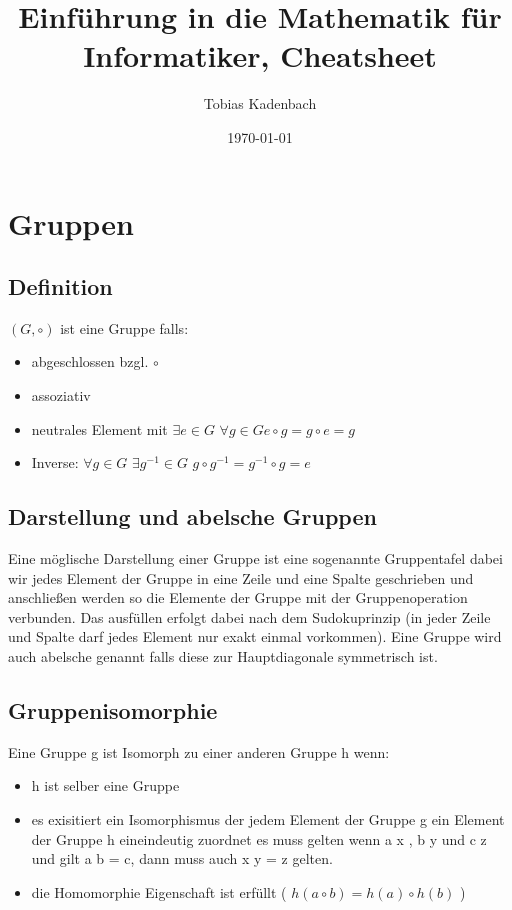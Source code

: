 \documentclass[12pt, letterpaper, twoside]{article}
\title{Einführung in die Mathematik für Informatiker, Cheatsheet}
\author{Tobias Kadenbach}
\date{\today}
\begin{document}
\maketitle

\tableofcontents 

\section{Gruppen}
\subsection{Definition}
$ (G, \circ) $ ist eine Gruppe falls:
\begin{itemize}
	\item abgeschlossen bzgl. $ \circ $
	\item assoziativ
	\item neutrales Element mit $ \exists e \in G $ $\forall g \in G e \circ g = g \circ e = g $
	\item Inverse: $ \forall g \in G $  $\exists g^{-1}  \in G $ $g \circ g^{-1} = g^{-1} \circ g = e $
\end{itemize}
\subsection{Darstellung und abelsche Gruppen}
\noindent
Eine möglische Darstellung einer Gruppe ist eine sogenannte Gruppentafel dabei wir jedes Element der Gruppe in eine Zeile und eine Spalte geschrieben und anschließen werden so die Elemente der Gruppe mit der Gruppenoperation verbunden. Das ausfüllen erfolgt dabei nach dem Sudokuprinzip (in jeder Zeile und Spalte darf jedes Element nur exakt einmal vorkommen).  
Eine Gruppe wird auch abelsche genannt falls diese zur Hauptdiagonale symmetrisch ist. \\

\subsection{Gruppenisomorphie}
\noindent
Eine Gruppe g ist Isomorph zu einer anderen Gruppe h wenn:
\begin{itemize}
	\item h ist selber eine Gruppe
	\item es exisitiert ein Isomorphismus der jedem Element der Gruppe g ein Element der Gruppe h eineindeutig zuordnet es muss gelten wenn a \mapsto x , b \mapsto y und c \mapsto z und gilt a \circ b = c, dann muss auch x \circ y = z gelten.
	\item die Homomorphie Eigenschaft ist erfüllt ( $ h(a \circ b) = h(a) \circ h(b) $ )
\end{itemize}
\end{document}
